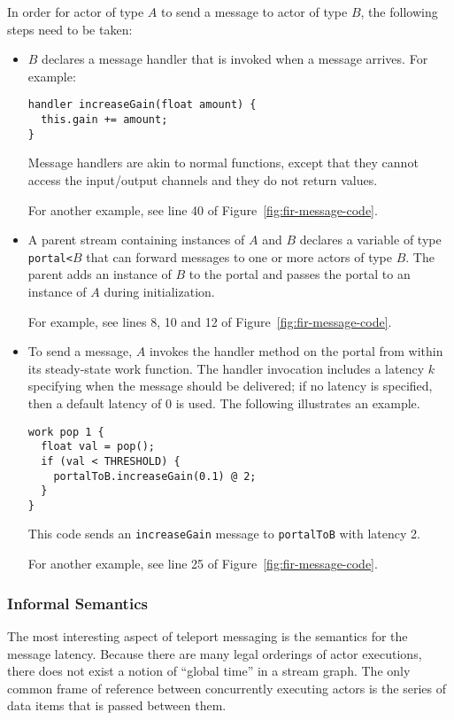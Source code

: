 In order for actor of type $A$ to send a message to actor of type $B$,
the following steps need to be taken:
\begin{itemize}

\item $B$ declares a message handler that is invoked when a
message arrives.  For example: {
\begin{verbatim}
handler increaseGain(float amount) {
  this.gain += amount;
}
\end{verbatim}
}
Message handlers are akin to normal functions, except that they
cannot access the input/output channels and they do not return values.

For another example, see line 40 of Figure~\ref{fig:fir-message-code}.

\item A parent stream containing instances of $A$ and $B$ declares a 
variable of type {\tt portal<}$B$\hspace{-1pt}{\tt >} that can forward
messages to one or more actors of type $B$.  The parent adds an
instance of $B$ to the portal and passes the portal to an instance of
$A$ during initialization.

For example, see lines 8, 10 and 12 of Figure~\ref{fig:fir-message-code}.

\item To send a message, $A$ invokes the handler method on the portal
from within its steady-state work function. The handler invocation
includes a latency $k$ specifying when the message should be
delivered; if no latency is specified, then a default latency of 0 is
used.  The following illustrates an example.
\begin{verbatim}
work pop 1 {
  float val = pop();
  if (val < THRESHOLD) {
    portalToB.increaseGain(0.1) @ 2;
  }
}
\end{verbatim}
This code sends an {\tt increaseGain} message to {\tt portalToB} with
latency 2.

For another example, see line 25 of Figure~\ref{fig:fir-message-code}.
\end{itemize}

\subsubsection*{Informal Semantics}

The most interesting aspect of teleport messaging is the semantics for
the message latency.  Because there are many legal orderings of actor
executions, there does not exist a notion of ``global time'' in a
stream graph.  The only common frame of reference between concurrently
executing actors is the series of data items that is passed between
them.

